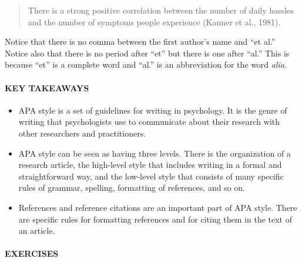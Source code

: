 \documentclass[
]{krantz}
\providecommand{\tightlist}{%
  \setlength{\itemsep}{0pt}\setlength{\parskip}{0pt}}
\begin{document}
\begin{quote}
There is a strong positive correlation between the number of daily hassles and the number of symptoms people experience (Kanner et al., 1981).
\end{quote}

Notice that there is no comma between the first author's name and ``et al.'' Notice also that there is no period after ``et'' but there is one after ``al.'' This is because ``et'' is a complete word and ``al.'' is an abbreviation for the word \emph{alia.}

\hypertarget{key-takeaways-31}{%
\paragraph*{KEY TAKEAWAYS}\label{key-takeaways-31}}

\begin{itemize}
\tightlist
\item
  APA style is a set of guidelines for writing in psychology. It is the genre of writing that psychologists use to communicate about their research with other researchers and practitioners.
\item
  APA style can be seen as having three levels. There is the organization of a research article, the high-level style that includes writing in a formal and straightforward way, and the low-level style that consists of many specific rules of grammar, spelling, formatting of references, and so on.
\item
  References and reference citations are an important part of APA style. There are specific rules for formatting references and for citing them in the text of an article.
\end{itemize}

\hypertarget{exercises-26}{%
\paragraph*{EXERCISES}\label{exercises-26}}
\end{document}
